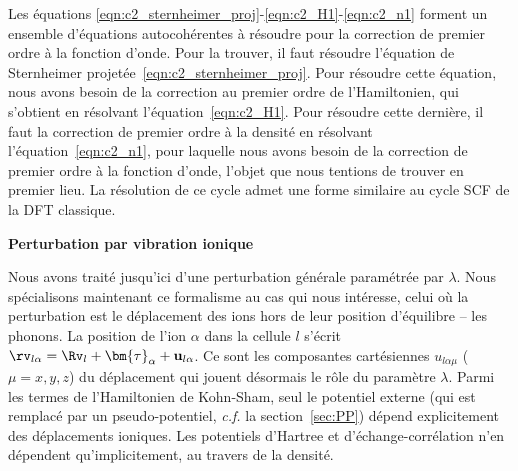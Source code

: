 Les équations \eqref{eqn:c2_sternheimer_proj}-\eqref{eqn:c2_H1}-\eqref{eqn:c2_n1} forment un ensemble d'équations autocohérentes à résoudre pour la correction de premier ordre à la fonction d'onde. Pour la trouver, il faut résoudre l'équation de Sternheimer projetée~\eqref{eqn:c2_sternheimer_proj}. Pour résoudre cette équation, nous avons besoin de la correction au premier ordre de l'Hamiltonien, qui s'obtient en résolvant l'équation~\eqref{eqn:c2_H1}. Pour résoudre cette dernière, il faut la correction de premier ordre à la densité en résolvant l'équation~\eqref{eqn:c2_n1}, pour laquelle nous avons besoin de la correction de premier ordre à la fonction d'onde, l'objet que nous tentions de trouver en premier lieu. La résolution de ce cycle admet une forme similaire au cycle SCF de la DFT classique.

\noindent\textbf{Perturbation par vibration ionique}

Nous avons traité jusqu'ici d'une perturbation générale paramétrée par $\lambda$. Nous spécialisons maintenant ce formalisme au cas qui nous intéresse, celui où la perturbation est le déplacement des ions hors de leur position d'équilibre -- les phonons. La position de l'ion $\alpha$ dans la cellule $l$ s'écrit $\rv_{l\alpha}=\Rv_l +\bm{\tau}_{\alpha}+\mathbf{u}_{l\alpha}$. Ce sont les composantes cartésiennes $u_{l\alpha\mu}$ ($\mu=x,y,z$) du déplacement qui jouent désormais le rôle du paramètre $\lambda$. Parmi les termes de l'Hamiltonien de Kohn-Sham, seul le potentiel externe (qui est remplacé par un pseudo-potentiel, \textit{c.f.} la section~\ref{sec:PP}) dépend explicitement des déplacements ioniques. Les potentiels d'Hartree et d'échange-corrélation n'en dépendent qu'implicitement, au travers de la densité.

